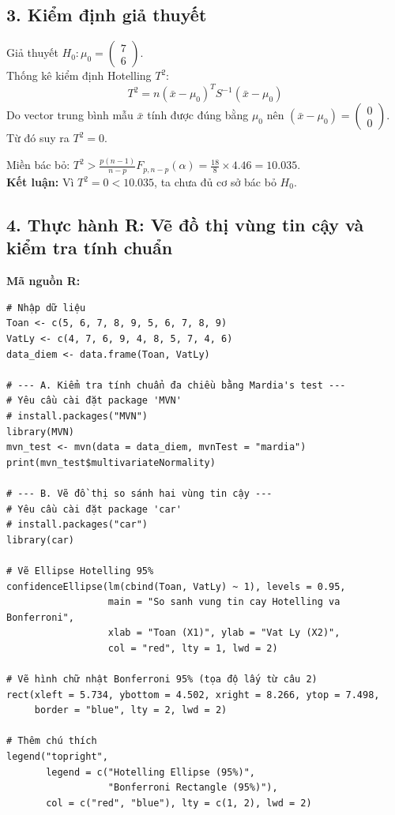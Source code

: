 \documentclass[12pt, a4paper]{article}
\begin{document}
\subsection*{3. Kiểm định giả thuyết}

Giả thuyết $H_0 : \mu_0 = \begin{pmatrix} 7 \\ 6 \end{pmatrix}$. \\
Thống kê kiểm định Hotelling $T^2$:
\[ T^2 = n(\bar{x} - \mu_0)^T S^{-1} (\bar{x} - \mu_0) \]
Do vector trung bình mẫu $\bar{x}$ tính được đúng bằng $\mu_0$ nên $(\bar{x} - \mu_0) = \begin{pmatrix} 0 \\ 0 \end{pmatrix}$. \\
Từ đó suy ra $T^2 = 0$.

Miền bác bỏ: $T^2 > \frac{p(n-1)}{n-p} F_{p, n-p}(\alpha) = \frac{18}{8} \times 4.46 = 10.035$. \\
\textbf{Kết luận:} Vì $T^2 = 0 < 10.035$, ta chưa đủ cơ sở bác bỏ $H_0$.

\subsection*{4. Thực hành R: Vẽ đồ thị vùng tin cậy và kiểm tra tính chuẩn}

\textbf{Mã nguồn R:}
\begin{verbatim}
# Nhập dữ liệu
Toan <- c(5, 6, 7, 8, 9, 5, 6, 7, 8, 9)
VatLy <- c(4, 7, 6, 9, 4, 8, 5, 7, 4, 6)
data_diem <- data.frame(Toan, VatLy)

# --- A. Kiểm tra tính chuẩn đa chiều bằng Mardia's test ---
# Yêu cầu cài đặt package 'MVN'
# install.packages("MVN")
library(MVN)
mvn_test <- mvn(data = data_diem, mvnTest = "mardia")
print(mvn_test$multivariateNormality)

# --- B. Vẽ đồ thị so sánh hai vùng tin cậy ---
# Yêu cầu cài đặt package 'car'
# install.packages("car")
library(car)

# Vẽ Ellipse Hotelling 95%
confidenceEllipse(lm(cbind(Toan, VatLy) ~ 1), levels = 0.95,
                  main = "So sanh vung tin cay Hotelling va Bonferroni",
                  xlab = "Toan (X1)", ylab = "Vat Ly (X2)",
                  col = "red", lty = 1, lwd = 2)

# Vẽ hình chữ nhật Bonferroni 95% (tọa độ lấy từ câu 2)
rect(xleft = 5.734, ybottom = 4.502, xright = 8.266, ytop = 7.498,
     border = "blue", lty = 2, lwd = 2)

# Thêm chú thích
legend("topright",
       legend = c("Hotelling Ellipse (95%)",
                  "Bonferroni Rectangle (95%)"),
       col = c("red", "blue"), lty = c(1, 2), lwd = 2)
\end{verbatim}
\end{document}
